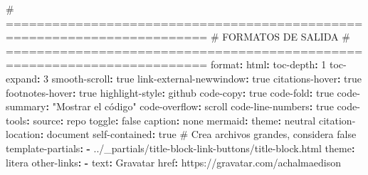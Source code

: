 \documentclass[
  doc,
  floatsintext,
  longtable,
  a4paper,
  nolmodern,
  notxfonts,
  notimes,
  12pt,
  colorlinks=true,linkcolor=blue,citecolor=blue,urlcolor=blue]{apa7}
\newenvironment{Shaded}{\begin{snugshade}}{\end{snugshade}}
\newcommand{\AttributeTok}[1]{\textcolor[rgb]{0.40,0.45,0.13}{#1}}
\newcommand{\CharTok}[1]{\textcolor[rgb]{0.13,0.47,0.30}{#1}}
\newcommand{\CommentTok}[1]{\textcolor[rgb]{0.37,0.37,0.37}{#1}}
\newcommand{\DecValTok}[1]{\textcolor[rgb]{0.68,0.00,0.00}{#1}}
\newcommand{\FunctionTok}[1]{\textcolor[rgb]{0.28,0.35,0.67}{#1}}
\newcommand{\KeywordTok}[1]{\textcolor[rgb]{0.00,0.23,0.31}{\textbf{#1}}}
\newcommand{\StringTok}[1]{\textcolor[rgb]{0.13,0.47,0.30}{#1}}
\newcounter{none} %
\begin{document}
\begin{Shaded}
\begin{Highlighting}[]
\CommentTok{\# ========================================================================}
\CommentTok{\# FORMATOS DE SALIDA}
\CommentTok{\# ========================================================================}
\FunctionTok{format}\KeywordTok{:}
\AttributeTok{  }\FunctionTok{html}\KeywordTok{:}
\AttributeTok{    }\FunctionTok{toc{-}depth}\KeywordTok{:}\AttributeTok{ }\DecValTok{1}
\AttributeTok{    }\FunctionTok{toc{-}expand}\KeywordTok{:}\AttributeTok{ }\DecValTok{3}
\AttributeTok{    }\FunctionTok{smooth{-}scroll}\KeywordTok{:}\AttributeTok{ }\CharTok{true}
\AttributeTok{    }\FunctionTok{link{-}external{-}newwindow}\KeywordTok{:}\AttributeTok{ }\CharTok{true}
\AttributeTok{    }\FunctionTok{citations{-}hover}\KeywordTok{:}\AttributeTok{ }\CharTok{true}
\AttributeTok{    }\FunctionTok{footnotes{-}hover}\KeywordTok{:}\AttributeTok{ }\CharTok{true}
\AttributeTok{    }\FunctionTok{highlight{-}style}\KeywordTok{:}\AttributeTok{ github}
\AttributeTok{    }\FunctionTok{code{-}copy}\KeywordTok{:}\AttributeTok{ }\CharTok{true}
\AttributeTok{    }\FunctionTok{code{-}fold}\KeywordTok{:}\AttributeTok{ }\CharTok{true}
\AttributeTok{    }\FunctionTok{code{-}summary}\KeywordTok{:}\AttributeTok{ }\StringTok{"Mostrar el código"}
\AttributeTok{    }\FunctionTok{code{-}overflow}\KeywordTok{:}\AttributeTok{ scroll}
\AttributeTok{    }\FunctionTok{code{-}line{-}numbers}\KeywordTok{:}\AttributeTok{ }\CharTok{true}
\AttributeTok{    }\FunctionTok{code{-}tools}\KeywordTok{:}
\AttributeTok{      }\FunctionTok{source}\KeywordTok{:}\AttributeTok{ repo}
\AttributeTok{      }\FunctionTok{toggle}\KeywordTok{:}\AttributeTok{ }\CharTok{false}
\AttributeTok{      }\FunctionTok{caption}\KeywordTok{:}\AttributeTok{ none}
\AttributeTok{    }\FunctionTok{mermaid}\KeywordTok{:}
\AttributeTok{      }\FunctionTok{theme}\KeywordTok{:}\AttributeTok{ neutral}
\AttributeTok{    }\FunctionTok{citation{-}location}\KeywordTok{:}\AttributeTok{ document}
\AttributeTok{    }\FunctionTok{self{-}contained}\KeywordTok{:}\AttributeTok{ }\CharTok{true}\CommentTok{  \#  Crea archivos grandes, considera false}
\AttributeTok{    }\FunctionTok{template{-}partials}\KeywordTok{:}
\AttributeTok{      }\KeywordTok{{-}}\AttributeTok{ ../\_partials/title{-}block{-}link{-}buttons/title{-}block.html}
\AttributeTok{    }\FunctionTok{theme}\KeywordTok{:}\AttributeTok{ litera}
\AttributeTok{    }\FunctionTok{other{-}links}\KeywordTok{:}
\AttributeTok{      }\KeywordTok{{-}}\AttributeTok{ }\FunctionTok{text}\KeywordTok{:}\AttributeTok{ Gravatar}
\AttributeTok{        }\FunctionTok{href}\KeywordTok{:}\AttributeTok{ https://gravatar.com/achalmaedison}

\end{Highlighting}
\end{Shaded}
\end{document}
